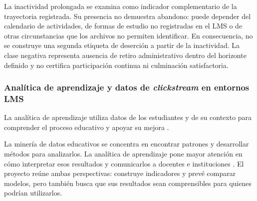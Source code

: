 La inactividad prolongada se examina como indicador complementario de la trayectoria registrada. Su presencia no demuestra abandono: puede depender del calendario de actividades, de formas de estudio no registradas en el LMS o de otras circunstancias que los archivos no permiten identificar. En consecuencia, no se construye una segunda etiqueta de deserción a partir de la inactividad. La clase negativa representa ausencia de retiro administrativo dentro del horizonte definido y no certifica participación continua ni culminación satisfactoria.


\subsubsection{Analítica de aprendizaje y datos de \textit{clickstream} en entornos LMS}

La analítica de aprendizaje utiliza datos de los estudiantes y de su contexto para comprender el proceso educativo y apoyar su mejora \cite{longsiemens2011,educsci11090552}.

La minería de datos educativos se concentra en encontrar patrones y desarrollar métodos para analizarlos. La analítica de aprendizaje pone mayor atención en cómo interpretar esos resultados y comunicarlos a docentes e instituciones \cite{siemensbaker2012,romeroventura2020}. El proyecto reúne ambas perspectivas: construye indicadores y prevé comparar modelos, pero también busca que sus resultados sean comprensibles para quienes podrían utilizarlos.


